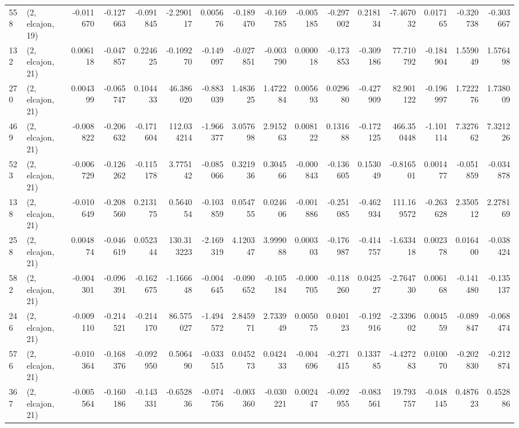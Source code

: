 \begin{tabular}{llrrrrrrrrrrrrrr}
558 &  (2, elcajon, 19) &  -0.011670 & -0.127663 & -0.091845 &   -2.290117 &  0.005676 &  -0.189470 &  -0.169785 & -0.005185 & -0.297002 &  0.218134 &   -7.467032 &  0.017165 &  -0.320738 &  -0.303667 \\
132 &  (2, elcajon, 21) &   0.006118 & -0.047857 &  0.224625 &   -0.109270 & -0.149097 &  -0.027851 &  -0.003790 &  0.000018 & -0.173853 & -0.309186 &   77.710792 & -0.184904 &   1.559049 &   1.576498 \\
270 &  (2, elcajon, 21) &   0.004399 & -0.065747 &  0.104433 &   46.386020 & -0.883039 &   1.483625 &   1.472284 &  0.005693 &  0.029680 & -0.427909 &   82.901122 & -0.196997 &   1.722276 &   1.738009 \\
469 &  (2, elcajon, 21) &  -0.008822 & -0.206632 & -0.171604 &  112.034214 & -1.966377 &   3.057698 &   2.915263 &  0.008122 &  0.131688 & -0.172125 &  466.350448 & -1.101114 &   7.327662 &   7.321226 \\
523 &  (2, elcajon, 21) &  -0.006729 & -0.126262 & -0.115178 &    3.775142 & -0.085066 &   0.321936 &   0.304566 & -0.000843 & -0.136605 &  0.153049 &   -0.816501 &  0.001477 &  -0.051859 &  -0.034878 \\
138 &  (2, elcajon, 21) &  -0.010649 & -0.208560 &  0.213175 &    0.564054 & -0.103859 &   0.054755 &   0.024606 & -0.001886 & -0.251085 & -0.462934 &  111.169572 & -0.263628 &   2.350512 &   2.278169 \\
258 &  (2, elcajon, 21) &   0.004874 & -0.046619 &  0.052344 &  130.313223 & -2.169319 &   4.120347 &   3.999088 &  0.000303 & -0.176987 & -0.414757 &   -1.633418 &  0.002378 &   0.016400 &  -0.038424 \\
582 &  (2, elcajon, 21) &  -0.004301 & -0.096391 & -0.162675 &   -1.166648 & -0.004645 &  -0.090652 &  -0.105184 & -0.000705 & -0.118260 &  0.042527 &   -2.764730 &  0.006168 &  -0.141480 &  -0.135137 \\
246 &  (2, elcajon, 21) &  -0.009110 & -0.214521 & -0.214170 &   86.575027 & -1.494572 &   2.845971 &   2.733949 &  0.005075 &  0.040123 & -0.192916 &   -2.339602 &  0.004559 &  -0.089847 &  -0.068474 \\
576 &  (2, elcajon, 21) &  -0.010364 & -0.168376 & -0.092950 &    0.506490 & -0.033515 &   0.045273 &   0.042433 & -0.004696 & -0.271415 &  0.133785 &   -4.427283 &  0.010070 &  -0.202830 &  -0.212874 \\
367 &  (2, elcajon, 21) &  -0.005564 & -0.160186 & -0.143331 &   -0.652836 & -0.074756 &  -0.003360 &  -0.030221 &  0.002447 & -0.092955 & -0.083561 &   19.793757 & -0.048145 &   0.487623 &   0.452886 \\

\end{tabular}
